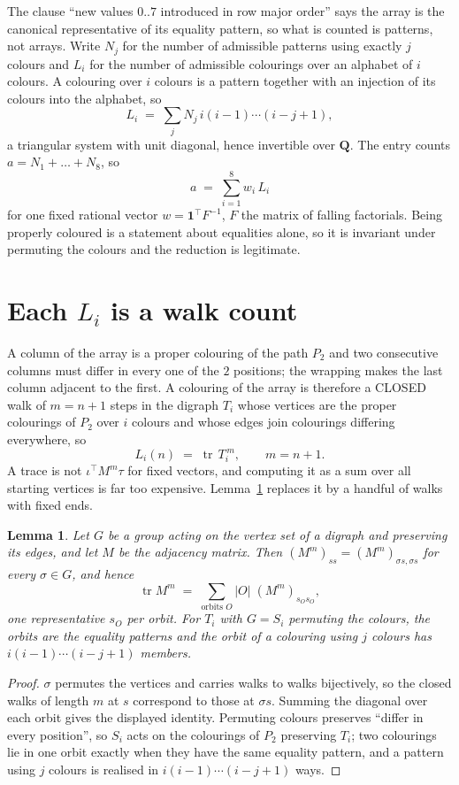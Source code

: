 \documentclass[11pt,a4paper]{article}
\theoremstyle{plain}
\newtheorem{lemma}[theorem]{Lemma}
\theoremstyle{definition}
\begin{document}
The clause ``new values $0..7$ introduced in row major order'' says the array is the
canonical representative of its equality pattern, so what is counted is patterns, not arrays.
Write $N_j$ for the number of admissible patterns using exactly $j$ colours and $L_i$ for the
number of admissible colourings over an alphabet of $i$ colours. A colouring over $i$ colours
is a pattern together with an injection of its colours into the alphabet, so
\[
L_i\;=\;\sum_j N_j\,i(i-1)\cdots(i-j+1),
\]
a triangular system with unit diagonal, hence invertible over $\mathbf{Q}$. The entry counts
$a=N_1+\dots+N_{8}$, so
\[
a\;=\;\sum_{i=1}^{8}w_i\,L_i
\]
for one fixed rational vector $w=\mathbf{1}^{\!\top}F^{-1}$, $F$ the matrix of falling
factorials. Being properly coloured is a statement about equalities alone, so it is invariant
under permuting the colours and the reduction is legitimate.

\section{Each $L_i$ is a walk count}

A column of the array is a proper colouring of the path $P_{2}$ and two consecutive
columns must differ in every one of the $2$ positions; the wrapping makes the last column
adjacent to the first. A colouring of the array is therefore a CLOSED walk of $m=n+1$ steps
in the digraph $T_i$ whose vertices are the proper colourings of $P_{2}$ over $i$ colours
and whose edges join colourings differing everywhere, so
\[
L_i(n)\;=\;\operatorname{tr}\,T_i^{\,m},\qquad m=n+1.
\]
A trace is not $\iota^{\!\top}M^m\tau$ for fixed vectors, and computing it as a sum over all
starting vertices is far too expensive. Lemma~\ref{lem:trace} replaces it by a handful of
walks with fixed ends.

\begin{lemma}\label{lem:trace}
Let $G$ be a group acting on the vertex set of a digraph and preserving its edges, and let $M$
be the adjacency matrix. Then $(M^m)_{ss}=(M^m)_{\sigma s,\sigma s}$ for every
$\sigma\in G$, and hence
\[
\operatorname{tr} M^m\;=\;\sum_{\text{orbits }O}|O|\;(M^m)_{s_O s_O} ,
\]
one representative $s_O$ per orbit. For $T_i$ with $G=S_i$ permuting the colours, the orbits
are the equality patterns and the orbit of a colouring using $j$ colours has
$i(i-1)\cdots(i-j+1)$ members.
\end{lemma}

\begin{proof}
$\sigma$ permutes the vertices and carries walks to walks bijectively, so the closed walks of
length $m$ at $s$ correspond to those at $\sigma s$. Summing the diagonal over each orbit
gives the displayed identity. Permuting colours preserves ``differ in every position'', so
$S_i$ acts on the colourings of $P_{2}$ preserving $T_i$; two colourings lie in one orbit
exactly when they have the same equality pattern, and a pattern using $j$ colours is realised
in $i(i-1)\cdots(i-j+1)$ ways.
\end{proof}
\end{document}
